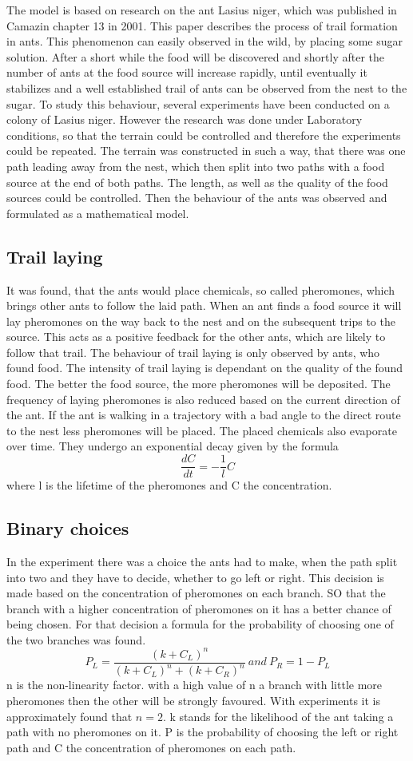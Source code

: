 The model is based on research on the ant Lasius niger, which was published in Camazin chapter 13 in 2001. This paper describes the process of trail formation in ants. This phenomenon can easily observed in the wild, by placing some sugar solution. After a short while the food will be discovered and shortly after the number of ants at the food source will increase rapidly, until eventually it stabilizes and a well established trail of ants can be observed from the nest to the sugar.  To study this behaviour, several experiments have been conducted on a colony of Lasius niger. However the research was done under Laboratory conditions, so that the terrain could be controlled and therefore the experiments could be repeated. The terrain was constructed in such a way, that there was one path leading away from the nest, which then split into two paths with a food source at the end of both paths. The length, as well as the quality of the food sources could be controlled. Then the behaviour of the ants was observed and formulated as a mathematical model.
\subsection{Trail laying}
It was found, that the ants would place chemicals, so called pheromones, which brings other ants to follow the laid path. When an ant finds a food source it will lay pheromones on the way back to the nest and on the subsequent trips to the source. This acts as a positive feedback for the other ants, which are likely to follow that trail. The behaviour of trail laying is only observed by ants, who found food. The intensity of trail laying is dependant on the quality of the found food. The better the food source, the more pheromones will be deposited. The frequency of laying pheromones is also reduced based on the current direction of the ant. If the ant is walking in a trajectory with a bad angle to the direct route to the nest less pheromones will be placed. The placed chemicals also evaporate over time. They undergo an exponential decay given by the formula
$$\frac{dC}{dt}=-\frac{1}{l}C$$
where l is the lifetime of the pheromones and C the concentration.
\subsection{Binary choices}
In the experiment there was a choice the ants had to make, when the path split into two and they have to decide, whether to go left or right. This decision is made based on the concentration of pheromones on each branch. SO that the branch with a higher concentration of pheromones on it has a better chance of being chosen. For that decision a formula for the probability of choosing one of the two branches was found.
$$ P_L = \frac{(k+C_L)^n}{(k+C_L)^n+(k+C_R)^n} \ and \  P_R = 1-P_L$$
n is the non-linearity factor. with a high value of n a branch with little more pheromones then the other will be strongly favoured. With experiments it is approximately found that $n=2$. k stands for the likelihood of the ant taking a path with no pheromones on it. P is the probability of choosing the left or right path and C the concentration of pheromones on each path. 
